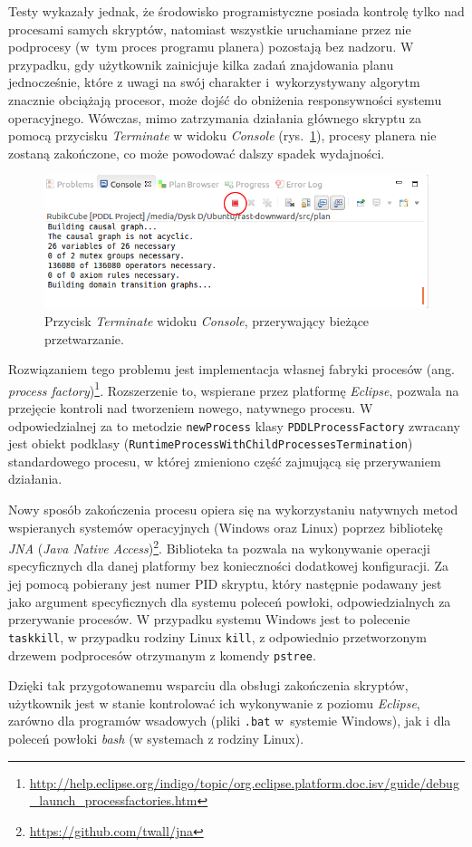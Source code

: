 Testy wykazały jednak, że środowisko programistyczne posiada kontrolę tylko nad procesami samych skryptów, natomiast wszystkie uruchamiane przez nie podprocesy (w~tym proces programu planera) pozostają bez nadzoru. W przypadku, gdy użytkownik zainicjuje kilka zadań znajdowania planu jednocześnie, które z uwagi na swój charakter i~wykorzystywany algorytm znacznie obciążają procesor, może dojść do obniżenia responsywności systemu operacyjnego. Wówczas, mimo zatrzymania działania głównego skryptu za pomocą przycisku \textit{Terminate} w widoku \textit{Console} (rys.~\ref{fig:terminate_button}), procesy planera nie zostaną zakończone, co może powodować dalszy spadek wydajności.

\begin{figure}[h!]
    \centering
    \includegraphics[width=\textwidth]{img/terminate_button}
    \caption{Przycisk \textit{Terminate} widoku \textit{Console}, przerywający bieżące przetwarzanie.}
    \label{fig:terminate_button}
\end{figure}

Rozwiązaniem tego problemu jest implementacja własnej fabryki procesów (ang. \textit{process factory})\footnote{\url{http://help.eclipse.org/indigo/topic/org.eclipse.platform.doc.isv/guide/debug_launch_processfactories.htm}}. Rozszerzenie to, wspierane przez platformę \emph{Eclipse}, pozwala na przejęcie kontroli nad tworzeniem nowego, natywnego procesu. W odpowiedzialnej za to metodzie \texttt{newProcess} klasy \texttt{PDDLProcessFactory} zwracany jest obiekt podklasy (\texttt{RuntimeProcessWith\-ChildProcessesTermination}) standardowego procesu, w której zmieniono część zajmującą się przerywaniem działania.

Nowy sposób zakończenia procesu opiera się na wykorzystaniu natywnych metod wspieranych systemów operacyjnych (Windows oraz Linux) poprzez bibliotekę \textit{JNA} (\textit{Java Native Access})\footnote{\url{https://github.com/twall/jna}}. Biblioteka ta pozwala na wykonywanie operacji specyficznych dla danej platformy bez konieczności dodatkowej konfiguracji. Za jej pomocą pobierany jest numer PID skryptu, który następnie podawany jest jako argument specyficznych dla systemu poleceń powłoki, odpowiedzialnych za przerywanie procesów. W przypadku systemu Windows jest to polecenie \texttt{taskkill}, w przypadku rodziny Linux \texttt{kill}, z odpowiednio przetworzonym drzewem podprocesów otrzymanym z komendy \texttt{pstree}.

Dzięki tak przygotowanemu wsparciu dla obsługi zakończenia skryptów, użytkownik jest w stanie kontrolować ich wykonywanie z poziomu \emph{Eclipse}, zarówno dla programów wsadowych (pliki \texttt{.bat} w~systemie Windows), jak i dla poleceń powłoki \textit{bash} (w systemach z rodziny Linux).
